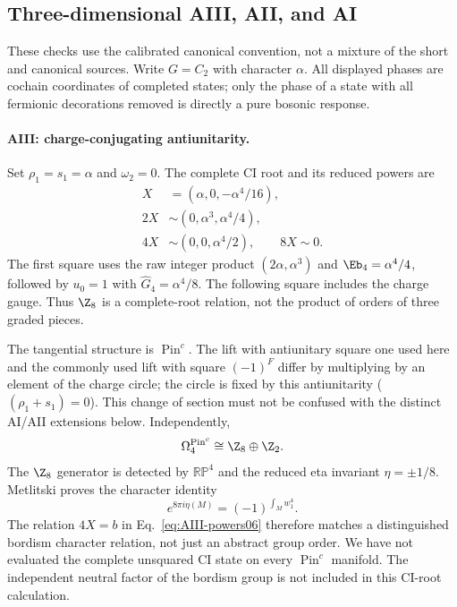 \subsection{Three-dimensional AIII, AII, and AI}\label{subsec:3d-examples}
\label{sec:3d-bordism06}
These checks use the calibrated canonical convention, not a mixture of the short and canonical sources. Write $G=C_2$ with character $\alpha$. All displayed phases are cochain coordinates of completed states; only the phase of a state with all fermionic decorations removed is directly a pure bosonic response.

\paragraph{AIII: charge-conjugating antiunitarity.}
Set ${\rho_1}={s_1}=\alpha$ and $\omega_2=0$. The complete CI root and its reduced powers are
\begin{align}\label{eq:AIII-powers06}
 X&=(\alpha,0,-\alpha^4/16),\\
 2X&\sim(0,\alpha^3,\alpha^4/4),\\
 4X&\sim(0,0,\alpha^4/2),\qquad8X\sim0.
\end{align}
The first square uses the raw integer product $(2\alpha,\alpha^3)$ and $\Eb_4=\alpha^4/4$, followed by $u_0=1$ with $\widehat G_4=\alpha^4/8$. The following square includes the charge gauge. Thus $\Z_8$ is a complete-root relation, not the product of orders of three graded pieces.

The tangential structure is $\operatorname{Pin}^c$. The lift with antiunitary square one used here and the commonly used lift with square $(-1)^F$ differ by multiplying by an element of the charge circle; the circle is fixed by this antiunitarity ($(\rho_1+s_1)=0$). This change of section must not be confused with the distinct AI/AII extensions below. Independently,
\begin{equation}
           \Omega_4^{\operatorname{Pin}^c}\cong\Z_8\oplus\Z_2.
\end{equation}
The $\Z_8$ generator is detected by $\mathbb{RP}^4$ and the reduced eta invariant $\eta=\pm1/8$. Metlitski proves the character identity~\cite[Eq.~(74) and Sec.~VI]{Metlitski}
\begin{equation}\label{eq:AIII-eta06}
               e^{8\pi i\eta(M)}=(-1)^{\int_M w_1^4}.
\end{equation}
The relation $4X=b$ in Eq.~\eqref{eq:AIII-powers06} therefore matches a distinguished bordism character relation, not just an abstract group order. We have not evaluated the complete unsquared CI state on every $\operatorname{Pin}^c$ manifold. The independent neutral factor of the bordism group is not included in this CI-root calculation.

